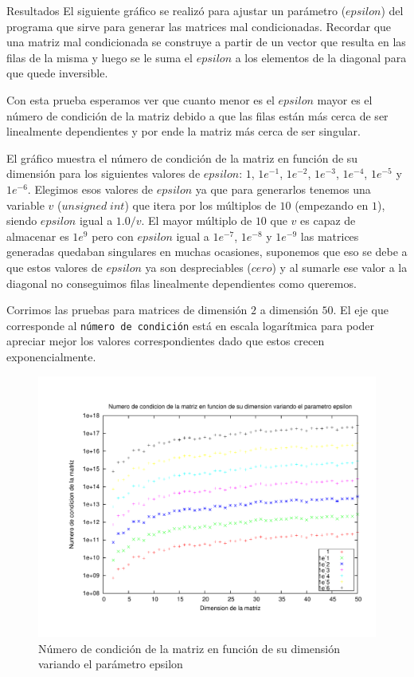 \begin{section}{Resultados}
	El siguiente gráfico se realizó para ajustar un parámetro ($epsilon$) del programa que sirve para generar las
	matrices mal condicionadas. Recordar que una matriz mal condicionada se construye a partir de un vector que 
	resulta en las filas de la misma y luego se le suma el $epsilon$ a los elementos de la diagonal para que quede 
	inversible.
	
	Con esta prueba esperamos ver que cuanto menor es el $epsilon$ mayor es el número de condición de la matriz
	 debido a que las filas están más cerca de ser linealmente dependientes y por ende la matriz más cerca de ser
	  singular.

	El gráfico muestra el número de condición de la matriz en función de su dimensión para los siguientes valores de
	$epsilon$: $1$, $1e^{-1}$, $1e^{-2}$, $1e^{-3}$, $1e^{-4}$, $1e^{-5}$ y $1e^{-6}$. Elegimos esos valores de
	$epsilon$ ya que para generarlos tenemos una variable $v$ ($unsigned\;int$) que itera por los múltiplos de $10$ 
	(empezando en $1$),	siendo $epsilon$ igual a $1.0/v$. El mayor múltiplo de $10$ que $v$ es capaz de almacenar es $1e^9$ 
	pero con $epsilon$ igual a $1e^{-7}$, $1e^{-8}$ y $1e^{-9}$ las matrices generadas quedaban singulares en muchas
	ocasiones, suponemos que eso se debe a que estos valores de $epsilon$ ya son despreciables ($cero$) y al sumarle 
	ese valor a la diagonal no conseguimos filas linealmente dependientes como queremos.
	
	Corrimos las pruebas para matrices de dimensión $2$ a dimensión $50$.
	El eje que corresponde al \texttt{número de condición} está en escala logarítmica para poder apreciar mejor los valores correspondientes dado que estos crecen exponencialmente.

	\begin{figure}[H]
	  \centering
		\includegraphics[width=14cm]{graficos/ajuste_epsilon.pdf}
	  \caption{Número de condición de la matriz en función de su dimensión variando el parámetro epsilon}
	  \label{fig:epsilon}
	\end{figure}
	

\end{section}
